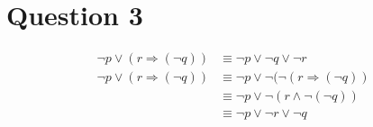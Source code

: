 \section*{Question 3}
\begin{align*} 
\neg p \vee  (r \Rightarrow (\neg q)) &\equiv \neg p \vee \neg q \vee \neg r \\
\neg p \vee (r \Rightarrow (\neg q)) &\equiv \neg p \vee \neg(\neg(r \Rightarrow (\neg q)) \\
&\equiv \neg p \vee \neg(r \wedge \neg(\neg q)) \\
&\equiv \neg p \vee \neg r \vee \neg q
\end{align*}